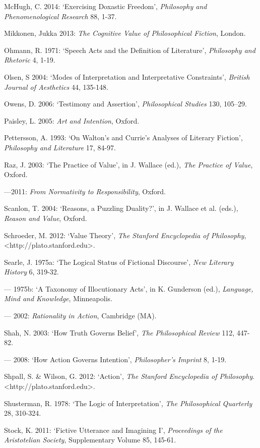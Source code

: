 \begin{hangparas}{.5cm}{1}
McHugh, C. 2014: `Exercising Doxastic Freedom', \emph{Philosophy and Phenomenological Research} 88, 1-37.

Mikkonen, Jukka 2013: \emph{The Cognitive Value of Philosophical Fiction}, London.

Ohmann, R. 1971: `Speech Acts and the Definition of Literature', \emph{Philosophy and Rhetoric} 4, 1-19.

Olsen, S 2004: `Modes of Interpretation and Interpretative Constraints', \emph{British Journal of Aesthetics} 44, 135-148.

Owens, D. 2006: `Testimony and Assertion', \emph{Philosophical Studies} 130, 105--29.

Paisley, L. 2005: \emph{Art and Intention}, Oxford.

Pettersson, A. 1993: `On Walton's and Currie's Analyses of Literary Fiction', \emph{Philosophy and Literature} 17, 84-97.

Raz, J. 2003: `The Practice of Value', in J. Wallace (ed.), \emph{The Practice of Value}, Oxford.

---2011: \emph{From Normativity to Responsibility}, Oxford. 

Scanlon, T. 2004: `Reasons, a Puzzling Duality?', in J. Wallace et al. (eds.), \emph{Reason and Value}, Oxford.

Schroeder, M. 2012: `Value Theory', \emph{The Stanford Encyclopedia of Philosophy}, \textless{}http://plato.stanford.edu\textgreater{}.

Searle, J. 1975a: `The Logical Status of Fictional Discourse', \emph{New Literary History} 6, 319-32.

--- 1975b: `A Taxonomy of Illocutionary Acts', in K. Gunderson (ed.), \emph{Language, Mind and Knowledge}, Minneapolis.

--- 2002: \emph{Rationality in Action}, Cambridge (MA). 

Shah, N. 2003: `How Truth Governs Belief', \emph{The Philosophical Review} 112, 447-82.

--- 2008: `How Action Governs Intention', \emph{Philosopher's Imprint} 8, 1-19.

Shpall, S. \& Wilson, G. 2012: `Action', \emph{The Stanford Encyclopedia of Philosophy}. \textless{}http://plato.stanford.edu\textgreater{}.

Shusterman, R. 1978: `The Logic of Interpretation', \emph{The Philosophical Quarterly} 28, 310-324.

Stock, K. 2011: `Fictive Utterance and Imagining I', \emph{Proceedings of the Aristotelian Society}, Supplementary Volume 85, 145-61.


\end{hangparas}
